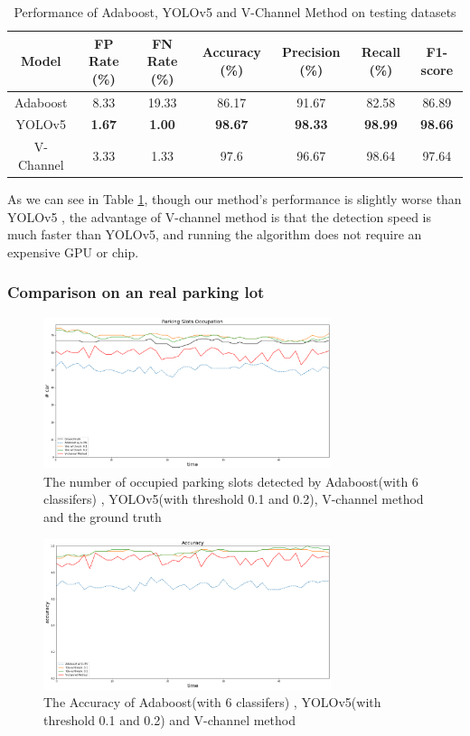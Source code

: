 \documentclass{article}[12pt]
\begin{document}
\begin{table}[H]
    \centering
    \caption{Performance of Adaboost, YOLOv5 and V-Channel Method on testing datasets}
    \begin{tabular}{@{}ccccccc@{}}
    \toprule
    Model    & FP Rate (\%)  & FN Rate (\%)  & Accuracy (\%)  & Precision (\%) & Recall (\%)    & F1-score       \\ \midrule
    Adaboost & 8.33          & 19.33         & 86.17          & 91.67          & 82.58          & 86.89          \\
    YOLOv5   & \textbf{1.67} & \textbf{1.00} & \textbf{98.67} & \textbf{98.33} & \textbf{98.99} & \textbf{98.66} \\ 
    V-Channel & 3.33 & 1.33 & 97.6 & 96.67 & 98.64 & 97.64 \\ \bottomrule
    \end{tabular}
    \label{tab:com_v}
\end{table}

As we can see in Table \ref{tab:com_v}, though our method's performance is slightly worse than YOLOv5
, the advantage of V-channel method is that the detection speed is much faster than YOLOv5, 
and running the algorithm does not require an expensive GPU or chip. 

\subsubsection{Comparison on an real parking lot}

\begin{figure}[H]
    \centering
    \includegraphics[width=0.75\textwidth]{figure/Parking_Slots_Occupation_v.png}
    \caption{The number of occupied parking slots detected by Adaboost(with 6 classifers)
    , YOLOv5(with threshold 0.1 and 0.2), V-channel method and the ground truth}
\end{figure}

\begin{figure}[H]
    \centering
    \includegraphics[width=0.75\textwidth]{figure/Accuracy_v.png}
    \caption{The Accuracy of Adaboost(with 6 classifers)
    , YOLOv5(with threshold 0.1 and 0.2) and V-channel method}
\end{figure}
\end{document}
